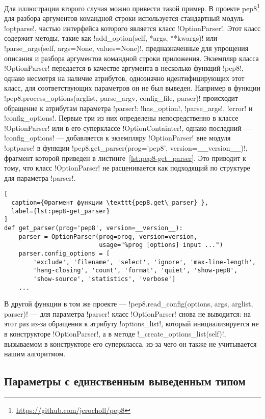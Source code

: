 Для иллюстрации второго случая можно привести такой пример. В проекте
pep8\footnote{\url{https://github.com/jcrocholl/pep8}} для разбора аргументов
командной строки используется стандартный модуль !optparse!, частью интерфейса
которого является класс !OptionParser!. Этот класс содержит методы, такие как
!add_option(self, *args, **kwargs)! или !parse_args(self, args=None, values=None)!, 
предназначенные для упрощения описания и разбора аргументов командной строки
приложения. Экземпляр класса !OptionParser! передается в качестве аргумента в
несколько функций !pep8!, однако несмотря на наличие атрибутов, однозначно
идентифицирующих этот класс, для соответствующих параметров он не был выведен.
Например в функции !pep8.process_options(arglist, parse_argv, config_file, parser)!
происходит обращение к атрибутам параметра
!parser!: !has_option!, !parse_args!, !error! и !config_options!. Первые три из
них определены непосредственно в классе !OptionParser! или в его суперклассе
!OptionContainter!, однако последний --- !config_options! --- добавляется к
экземпляру !OptionParser! вне модуля !optparse! в функции
!pep8.get_parser(prog='pep8', version=__version__)!, фрагмент которой приведен в
листинге~\ref{lst:pep8-get_parser}. Это приводит к тому, что класс
!OptionParser! не расценивается как подходящий по структуре для параметра
!parser!.

\newpage
\begin{lstlisting}[
  caption={Фрагмент функции \texttt{pep8.get\_parser} }, 
  label={lst:pep8-get_parser} 
]
def get_parser(prog='pep8', version=__version__):
    parser = OptionParser(prog=prog, version=version,
                          usage="%prog [options] input ...")
    parser.config_options = [
        'exclude', 'filename', 'select', 'ignore', 'max-line-length',
        'hang-closing', 'count', 'format', 'quiet', 'show-pep8',
        'show-source', 'statistics', 'verbose']
    ...
\end{lstlisting}

В другой функции в том же проекте --- 
!pep8.read_config(options, args, arglist, parser)!
--- для параметра !parser!
класс !OptionParser! снова не выводится: на этот раз из-за обращения к атрибуту
!options_list!, который инициализируется не в конструкторе !OptionParser!, а в
методе !_create_options_list(self)!, вызываемом в конструкторе его суперкласса,
из-за чего он также не учитывается нашим алгоритмом.

\subsection{Параметры с единственным выведенным типом}
\label{sub:single-type-parameters}

